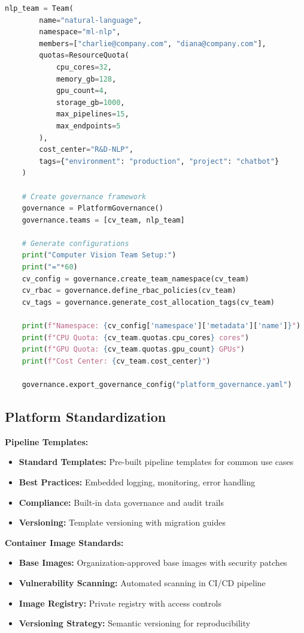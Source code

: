 \begin{lstlisting}[language=Python, caption=Platform Governance Framework]
    nlp_team = Team(
        name="natural-language",
        namespace="ml-nlp",
        members=["charlie@company.com", "diana@company.com"],
        quotas=ResourceQuota(
            cpu_cores=32,
            memory_gb=128,
            gpu_count=4,
            storage_gb=1000,
            max_pipelines=15,
            max_endpoints=5
        ),
        cost_center="R&D-NLP",
        tags={"environment": "production", "project": "chatbot"}
    )

    # Create governance framework
    governance = PlatformGovernance()
    governance.teams = [cv_team, nlp_team]

    # Generate configurations
    print("Computer Vision Team Setup:")
    print("="*60)
    cv_config = governance.create_team_namespace(cv_team)
    cv_rbac = governance.define_rbac_policies(cv_team)
    cv_tags = governance.generate_cost_allocation_tags(cv_team)

    print(f"Namespace: {cv_config['namespace']['metadata']['name']}")
    print(f"CPU Quota: {cv_team.quotas.cpu_cores} cores")
    print(f"GPU Quota: {cv_team.quotas.gpu_count} GPUs")
    print(f"Cost Center: {cv_team.cost_center}")

    governance.export_governance_config("platform_governance.yaml")
\end{lstlisting}

\subsection{Platform Standardization}

\textbf{Pipeline Templates:}
\begin{itemize}
    \item \textbf{Standard Templates:} Pre-built pipeline templates for common use cases
    \item \textbf{Best Practices:} Embedded logging, monitoring, error handling
    \item \textbf{Compliance:} Built-in data governance and audit trails
    \item \textbf{Versioning:} Template versioning with migration guides
\end{itemize}

\textbf{Container Image Standards:}
\begin{itemize}
    \item \textbf{Base Images:} Organization-approved base images with security patches
    \item \textbf{Vulnerability Scanning:} Automated scanning in CI/CD pipeline
    \item \textbf{Image Registry:} Private registry with access controls
    \item \textbf{Versioning Strategy:} Semantic versioning for reproducibility
\end{itemize}

